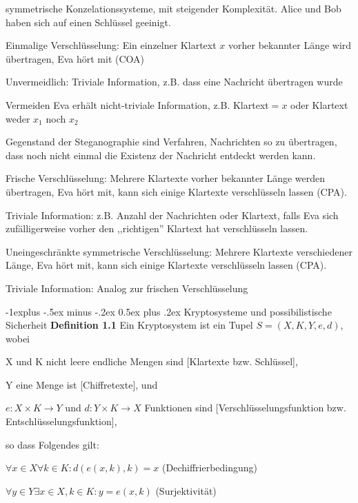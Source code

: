 \documentclass[a4paper]{article}
\makeatletter
\renewcommand{\subsection}{\@startsection{subsection}{2}{0mm}%
 {-1explus -.5ex minus -.2ex}%
 {0.5ex plus .2ex}%
 {\normalfont\normalsize\bfseries}}
\makeatother
\begin{document}
\begin{multicols}{3}
    symmetrische Konzelationssysteme, mit steigender Komplexität. 
    Alice und Bob haben sich auf einen Schlüssel geeinigt.
    \begin{enumerate*}
        \item Einmalige Verschlüsselung: Ein einzelner Klartext $x$ vorher bekannter Länge wird übertragen, Eva hört mit (COA)
        \begin{itemize*}
            \item Unvermeidlich: Triviale Information, z.B. dass eine Nachricht übertragen wurde
            \item Vermeiden Eva erhält nicht-triviale Information, z.B. Klartext$=x$ oder Klartext weder $x_1$ noch $x_2$
            \item Gegenstand der Steganographie sind Verfahren, Nachrichten so zu übertragen, dass noch nicht einmal die Existenz der Nachricht entdeckt werden kann.
        \end{itemize*}
        \item Frische Verschlüsselung: Mehrere Klartexte vorher bekannter Länge werden übertragen, Eva hört mit, kann sich einige Klartexte verschlüsseln lassen (CPA).
        \begin{itemize*}
            \item Triviale Information: z.B. Anzahl der Nachrichten oder Klartext, falls Eva sich zufälligerweise vorher den ,,richtigen'' Klartext hat verschlüsseln lassen.
        \end{itemize*}
        \item Uneingeschränkte symmetrische Verschlüsselung: Mehrere Klartexte verschiedener Länge, Eva hört mit, kann sich einige Klartexte verschlüsseln lassen (CPA).
        \begin{itemize*}
            \item Triviale Information: Analog zur frischen Verschlüsselung
        \end{itemize*}
    \end{enumerate*}

    \subsection{Kryptosysteme und possibilistische Sicherheit}
    \textbf{Definition 1.1} Ein Kryptosystem ist ein Tupel $S=(X,K,Y,e,d)$, wobei
    \begin{itemize*}
        \item X und K nicht leere endliche Mengen sind [Klartexte bzw. Schlüssel],
        \item Y eine Menge ist [Chiffretexte], und
        \item $e:X\times K\rightarrow Y$ und $d:Y\times K\rightarrow X$ Funktionen sind [Verschlüsselungsfunktion bzw. Entschlüsselungsfunktion],
    \end{itemize*}
    so dass Folgendes gilt:
    \begin{enumerate*}
        \item $\forall x\in X\forall k\in K:d(e(x,k),k) =x$ (Dechiffrierbedingung)
        \item $\forall y\in Y\exists x\in X,k\in K:y=e(x,k)$ (Surjektivität)
    \end{enumerate*}


\end{multicols}
\end{document}
